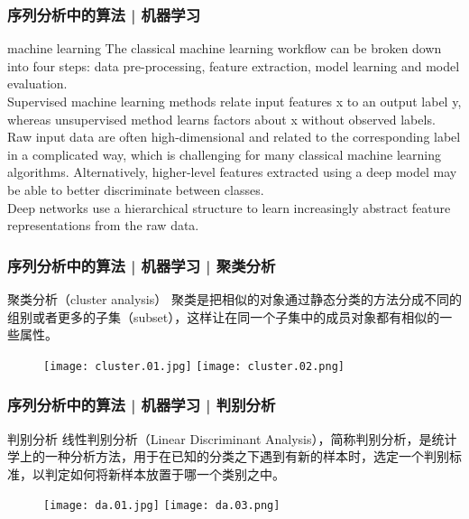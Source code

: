 \begin{frame}
  \frametitle{序列分析中的算法 | 机器学习}
  \begin{block}{machine learning}
    The classical machine learning workflow can be broken down into four steps: data pre-processing, feature extraction, model learning and model evaluation.\\
    \vspace{0.5em}
    Supervised machine learning methods relate input features x to an output label y, whereas unsupervised method learns factors about x without observed labels.\\
    \vspace{0.5em}
    Raw input data are often high-dimensional and related to the corresponding label in a complicated way, which is challenging for many classical machine learning algorithms. Alternatively, higher-level features extracted using a deep model may be able to better discriminate between classes.\\
    \vspace{0.5em}
    Deep networks use a hierarchical structure to learn increasingly abstract feature representations from the raw data.
  \end{block}
\end{frame}

\begin{frame}
  \frametitle{序列分析中的算法 | 机器学习 | 聚类分析}
  \begin{block}{聚类分析（cluster analysis）}
    聚类是把相似的对象通过静态分类的方法分成不同的组别或者更多的子集（subset），这样让在同一个子集中的成员对象都有相似的一些属性。
  \end{block}
  \begin{figure}
    \centering
    \texttt{[image: cluster.01.jpg]}
    \texttt{[image: cluster.02.png]}
  \end{figure}
\end{frame}

\begin{frame}
  \frametitle{序列分析中的算法 | 机器学习 | 判别分析}
  \begin{block}{判别分析}
    线性判别分析（Linear Discriminant Analysis），简称判别分析，是统计学上的一种分析方法，用于在已知的分类之下遇到有新的样本时，选定一个判别标准，以判定如何将新样本放置于哪一个类别之中。
  \end{block}
  \begin{figure}
    \centering
    \texttt{[image: da.01.jpg]}
    \texttt{[image: da.03.png]}
  \end{figure}
\end{frame}

